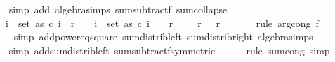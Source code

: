 \begin{isabellebody}
\ \ \ \ \isamarkupfalse%
\ {\isacharparenleft}{\kern0pt}simp\ add{\isacharcolon}{\kern0pt}\ algebra{\isacharunderscore}{\kern0pt}simps\ sum{\isacharunderscore}{\kern0pt}subtractf\ sum{\isacharunderscore}{\kern0pt}collapse{\isacharparenright}{\kern0pt}\isanewline
\ \ \isamarkupfalse%
\ \isamarkupfalse%
\ {\isachardoublequoteopen}{\isachardot}{\kern0pt}{\isachardot}{\kern0pt}{\isachardot}{\kern0pt}\ {\isacharequal}{\kern0pt}\ {}\ {\isacharasterisk}{\kern0pt}\ {\isacharparenleft}{\kern0pt}{\isasymSum}i\ {\isasymin}\ set\ as{\isachardot}{\kern0pt}\ c\ i{\isacharcircum}{\kern0pt}{}\ {\isacharasterisk}{\kern0pt}\ r\ {}{\isacharparenright}{\kern0pt}{\isacharcircum}{\kern0pt}{}\ {\isacharplus}{\kern0pt}\ {\isacharparenleft}{\kern0pt}{\isasymSum}\ i\ {\isasymin}\ set\ as{\isachardot}{\kern0pt}\ c\ i\ {\isacharcircum}{\kern0pt}\ {}\ {\isacharasterisk}{\kern0pt}\ {\isacharparenleft}{\kern0pt}r\ {}\ {\isacharminus}{\kern0pt}\ {}\ {\isacharasterisk}{\kern0pt}\ r\ {}\ {\isacharasterisk}{\kern0pt}\ r\ {}{\isacharparenright}{\kern0pt}{\isacharparenright}{\kern0pt}{\isachardoublequoteclose}\isanewline
\ \ \ \ \isamarkupfalse%
\ {\isacharparenleft}{\kern0pt}rule\ arg{\isacharunderscore}{\kern0pt}cong{}{\isacharbrackleft}{\kern0pt}\ f{\isacharequal}{\kern0pt}{\isachardoublequoteopen}{\isacharparenleft}{\kern0pt}{\isacharplus}{\kern0pt}{\isacharparenright}{\kern0pt}{\isachardoublequoteclose}{\isacharbrackright}{\kern0pt}{\isacharparenright}{\kern0pt}\isanewline
\ \ \ \ \ \isamarkupfalse%
\ {\isacharparenleft}{\kern0pt}simp\ add{\isacharcolon}{\kern0pt}power{}{\isacharunderscore}{\kern0pt}eq{\isacharunderscore}{\kern0pt}square\ sum{\isacharunderscore}{\kern0pt}distrib{\isacharunderscore}{\kern0pt}left\ sum{\isacharunderscore}{\kern0pt}distrib{\isacharunderscore}{\kern0pt}right\ algebra{\isacharunderscore}{\kern0pt}simps{\isacharparenright}{\kern0pt}\isanewline
\ \ \ \ \isamarkupfalse%
\ {\isacharparenleft}{\kern0pt}simp\ add{\isacharcolon}{\kern0pt}sum{\isacharunderscore}{\kern0pt}distrib{\isacharunderscore}{\kern0pt}left\ sum{\isacharunderscore}{\kern0pt}subtractf{\isacharbrackleft}{\kern0pt}symmetric{\isacharbrackright}{\kern0pt}{\isacharparenright}{\kern0pt}\isanewline
\ \ \ \ \isamarkupfalse%
\ {\isacharparenleft}{\kern0pt}rule\ sum{\isachardot}{\kern0pt}cong{\isacharcomma}{\kern0pt}\ simp{\isacharparenright}{\kern0pt}\isanewline

\end{isabellebody}
